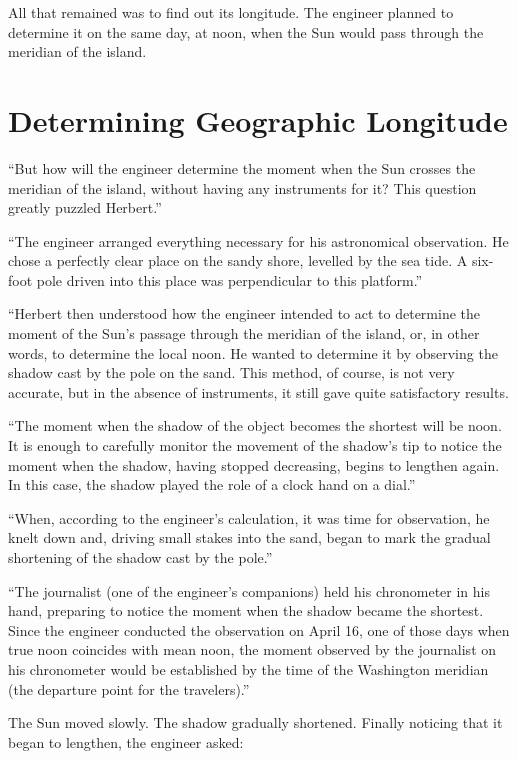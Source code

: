 All that remained was to find out its longitude. The engineer planned to determine it on the same day, at noon, when the Sun would pass through the meridian of the island.

\section{Determining Geographic Longitude}
\label{sec-7.3}

``But how will the engineer determine the moment when the Sun crosses the meridian of the island, without having any instruments for it? This question greatly puzzled Herbert.''

``The engineer arranged everything necessary for his astronomical observation. He chose a perfectly clear place on the sandy shore, levelled by the sea tide. A six-foot pole driven into this place was perpendicular to this platform.''

``Herbert then understood how the engineer intended to act to determine the moment of the Sun's passage through the meridian of the island, or, in other words, to determine the local noon. He wanted to determine it by observing the shadow cast by the pole on the sand. This method, of course, is not very accurate, but in the absence of instruments, it still gave quite satisfactory results.

``The moment when the shadow of the object becomes the shortest will be noon. It is enough to carefully monitor the movement of the shadow's tip to notice the moment when the shadow, having stopped decreasing, begins to lengthen again. In this case, the shadow played the role of a clock hand on a dial.''

``When, according to the engineer's calculation, it was time for observation, he knelt down and, driving small stakes into the sand, began to mark the gradual shortening of the shadow cast by the pole.''

``The journalist (one of the engineer's companions) held his chronometer in his hand, preparing to notice the moment when the shadow became the shortest. Since the engineer conducted the observation on April 16, one of those days when true noon coincides with mean noon, the moment observed by the journalist on his chronometer would be established by the time of the Washington meridian (the departure point for the travelers).''

The Sun moved slowly. The shadow gradually shortened. Finally noticing that it began to lengthen, the engineer asked:

